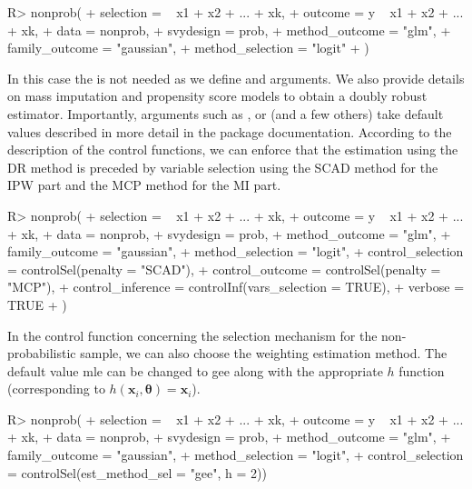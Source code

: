 \documentclass[
]{jss}
\begin{document}
\begin{CodeChunk}
\begin{CodeInput}
R> nonprob(
+   selection = ~ x1 + x2 + ... + xk, 
+   outcome = y ~ x1 + x2 + ... + xk, 
+   data = nonprob, 
+   svydesign = prob, 
+   method_outcome = "glm", 
+   family_outcome = "gaussian",
+   method_selection = "logit"
+ )
\end{CodeInput}
\end{CodeChunk}

In this case the  is not needed as we define
 and  arguments. We also provide details
on mass imputation and propensity score models to obtain a doubly robust
estimator. Importantly, arguments such as ,
 or  (and a few others)
take default values described in more detail in the package
documentation. According to the description of the control functions, we
can enforce that the estimation using the DR method is preceded by
variable selection using the SCAD method for the IPW part and the MCP
method for the MI part.

\begin{CodeChunk}
\begin{CodeInput}
R> nonprob(
+   selection = ~ x1 + x2 + ... + xk, 
+   outcome = y ~ x1 + x2 + ... + xk, 
+   data = nonprob, 
+   svydesign = prob, 
+   method_outcome = "glm", 
+   family_outcome = "gaussian",
+   method_selection = "logit",
+   control_selection = controlSel(penalty = "SCAD"),
+   control_outcome = controlSel(penalty = "MCP"),
+   control_inference = controlInf(vars_selection = TRUE),
+   verbose = TRUE
+ )
\end{CodeInput}
\end{CodeChunk}

In the control function concerning the selection mechanism for the
non-probabilistic sample, we can also choose the weighting estimation
method. The default value mle can be changed to gee along with the
appropriate \(h\) function (corresponding to
\(h\left(\boldsymbol{x}_i, \boldsymbol{\theta}\right) = \boldsymbol{x}_i\)).

\begin{CodeChunk}
\begin{CodeInput}
R> nonprob(
+   selection = ~ x1 + x2 + ... + xk, 
+   outcome = y ~ x1 + x2 + ... + xk, 
+   data = nonprob, 
+   svydesign = prob, 
+   method_outcome = "glm", 
+   family_outcome = "gaussian",
+   method_selection = "logit",
+   control_selection = controlSel(est_method_sel = "gee", h = 2))
\end{CodeInput}
\end{CodeChunk}
\end{document}
